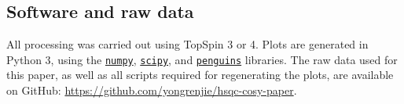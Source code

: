 \documentclass[a4paper,12pt]{article}
\begin{document}
\begin{refsection}
\startcontents[si]
\vfill
\hspace{0pt}
\newpage
\section{Software and raw data}

All processing was carried out using TopSpin 3 or 4.
Plots are generated in Python 3, using the \href{https://github.com/numpy/numpy}{\texttt{numpy}}, \href{https://github.com/scipy/scipy}{\texttt{scipy}}, and \href{https://github.com/yongrenjie/penguins}{\texttt{penguins}} libraries.
The raw data used for this paper, as well as all scripts required for regenerating the plots, are available on GitHub: \url{https://github.com/yongrenjie/hsqc-cosy-paper}.


\clearpage    %

\end{refsection}
\end{document}

